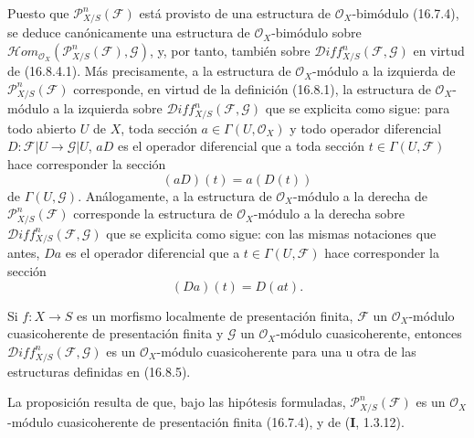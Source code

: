 \begin{env}[16.8.5]
\label{IV.16.8.5}
Puesto que $\mathscr{P}_{X/S}^n(\mathscr{F})$ está provisto de una estructura
de $\mathcal{O}_X$-bimódulo (16.7.4), se deduce canónicamente una estructura
de $\mathcal{O}_X$-bimódulo sobre
$\mathscr{H}\!om_{\mathcal{O}_X}
(\mathscr{P}_{X/S}^n(\mathscr{F}),\mathscr{G})$, y, por tanto, también sobre
$\mathscr{D}\!iff_{X/S}^n(\mathscr{F},\mathscr{G})$ en virtud de (16.8.4.1).
Más precisamente, a la estructura de $\mathcal{O}_X$-módulo a la izquierda
de $\mathscr{P}_{X/S}^n(\mathscr{F})$ corresponde, en virtud de la definición
(16.8.1), la estructura de $\mathcal{O}_X$-módulo a la izquierda sobre
$\mathscr{D}\!iff_{X/S}^n(\mathscr{F},\mathscr{G})$ que se explicita como
sigue: para todo abierto $U$ de $X$, toda sección
$a\in\Gamma(U,\mathcal{O}_X)$ y todo operador diferencial
$D:\mathscr{F}|U\to\mathscr{G}|U$, $aD$ es el operador diferencial que a
toda sección $t\in\Gamma(U,\mathscr{F})$ hace corresponder la sección
\[
  (aD)(t)=a(D(t))
  \tag{16.8.5.1}
  \label{IV.16.8.5.1}
\]
de $\Gamma(U,\mathscr{G})$. Análogamente, a la estructura de
$\mathcal{O}_X$-módulo a la derecha de $\mathscr{P}_{X/S}^n(\mathscr{F})$
corresponde la estructura de $\mathcal{O}_X$-módulo a la derecha sobre
$\mathscr{D}\!iff_{X/S}^n(\mathscr{F},\mathscr{G})$ que se explicita como
sigue: con las mismas notaciones que antes, $Da$ es el operador diferencial
que a $t\in\Gamma(U,\mathscr{F})$ hace corresponder la sección
\[
  (Da)(t)=D(at).
  \tag{16.8.5.2}
  \label{IV.16.8.5.2}
\]
\end{env}

\begin{proposition}[16.8.6]
\label{IV.16.8.6}
Si $f:X\to S$ es un morfismo localmente de presentación finita,
$\mathscr{F}$ un $\mathcal{O}_X$-módulo cuasicoherente de presentación finita
y $\mathscr{G}$ un $\mathcal{O}_X$-módulo cuasicoherente, entonces
$\mathscr{D}\!iff_{X/S}^n(\mathscr{F},\mathscr{G})$ es un
$\mathcal{O}_X$-módulo cuasicoherente para una u otra de las estructuras
definidas en \textup{(16.8.5)}.
\end{proposition}

La proposición resulta de que, bajo las hipótesis formuladas,
$\mathscr{P}_{X/S}^n(\mathscr{F})$ es un $\mathcal{O}_X$-módulo
cuasicoherente de presentación finita (16.7.4), y de (\textbf I, 1.3.12).

